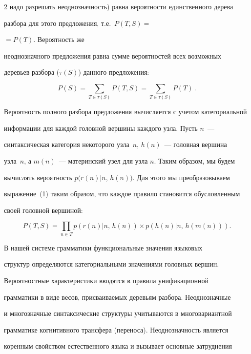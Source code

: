 \begin{multicols}{2}
надо разрешать неоднозначность) равна  вероятности единственного дерева


разбора для этого предложения, т.е.\ $P(T,S)=$\linebreak


$=P(T)$. Вероятность же


неоднозначного предложения равна сумме вероятностей всех возможных


деревьев разбора ($\tau (S)$) данного предложения:


    $$


P(S) = \sum\limits_{T\in \tau (S)} P(T,S) = \sum\limits_{T\in\tau (S)} P(T)\,.


$$





Вероятность полного разбора предложения вычисляется с учетом категориальной 


информации для каждой головной вершины каждого узла. Пусть $n$~--- 


синтаксическая категория некоторого узла~$n$, $h(n)$~--- головная вершина 


узла~$n$, а $m(n)$~--- материнский узел для узла $n$. Таким образом, мы будем 


вычислять вероятность  $p(r(n)\vert n$, $h(n))$. Для этого мы преобразовываем 


выражение~(1) таким образом, что каждое правило становится обу\-слов\-лен\-ным 


своей головной вершиной:


$$


P(T,S) = \prod\limits_{n\in T} p(r(n)\vert n,\, h(n))\times p(h(n)\vert


n,\,h(m(n))).


$$





В нашей системе грамматики функциональные значения языковых


структур определяются категориальными значениями головных вершин.


Вероятностные характеристики вводятся в правила унификационной


грамматики в виде весов, присваиваемых деревьям разбора. Неоднозначные


и многозначные синтаксические структуры учитываются в многовариантной


грамматике когнитивного трансфера (переноса). Неоднозначность является


коренным свойством естественного языка и вызывает основные затруднения



\end{multicols}
